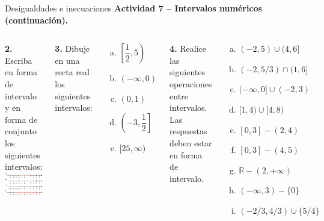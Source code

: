 \documentclass[9pt, aspectratio=169]{beamer}
\begin{document}
\begin{frame}{Desigualdades e inecuaciones}
\textbf{Actividad 7 -- Intervalos numéricos (continuación).}
\medskip

\begin{columns}[t]
\textbf{2.} Escriba en forma de intervalo y en forma de conjunto los siguientes intervalos: \\[1em]
\includegraphics[scale=0.7]{figs/fig-09.pdf}

\textbf{3.} Dibuje en una recta real los siguientes intervalos:
\begin{multicols}{3}
    \begin{enumerate}[a)]
        \item $\left[ \dfrac{1}{2}, 5 \right)$
        \item $(-\infty, 0)$
        \item $(0,1)$
        \item $\left(-3, \dfrac{1}{2} \right] $
        \item $[25 ,\infty)$
    \end{enumerate}     
\end{multicols}
\textbf{4.} Realice las siguientes operaciones entre intervalos. Las respuestas deben estar en forma de intervalo.
\begin{multicols}{2}
    \begin{enumerate}[a)]
        \item $(-2, 5) \cup (4, 6]$
        \item $(-2, 5/3) \cap (1, 6]$
\item $(-\infty, 0] \cup (-2, 3)$
\item $[1, 4) \cup [4, 8)$
\item $[0,3] - (2, 4)$
\item $[0, 3] - (4, 5)$
\item $\mathbb{R} - (2, +\infty)$
\item $(-\infty, 3) - \{0\}$
\item $(-2/3, 4/3) \cup \{5/4\}$
    \end{enumerate}
\end{multicols}
\end{columns}
\end{frame}
\end{document}
